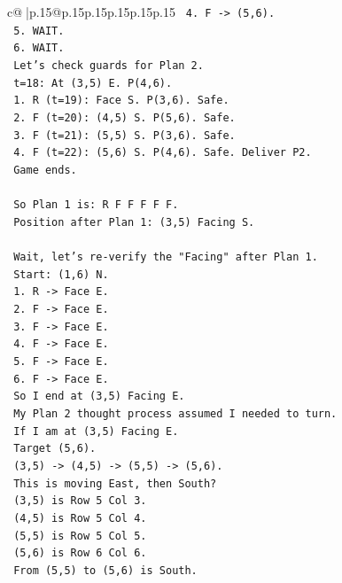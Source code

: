 \documentclass{article}
\begin{document}
{\begin{supertabular}{c@{$\;$}|p{.15\linewidth}@{}p{.15\linewidth}p{.15\linewidth}p{.15\linewidth}p{.15\linewidth}p{.15\linewidth}}
{{{\texttt{      4. F {-}> (5,6).} \\
\texttt{      5. WAIT.} \\
\texttt{      6. WAIT.} \\
\texttt{   Let's check guards for Plan 2.} \\
\texttt{   t=18: At (3,5) E. P(4,6).} \\
\texttt{   1. R (t=19): Face S. P(3,6). Safe.} \\
\texttt{   2. F (t=20): (4,5) S. P(5,6). Safe.} \\
\texttt{   3. F (t=21): (5,5) S. P(3,6). Safe.} \\
\texttt{   4. F (t=22): (5,6) S. P(4,6). Safe. Deliver P2.} \\
\texttt{   Game ends.} \\
\\ 
\texttt{   So Plan 1 is: R F F F F F.} \\
\texttt{   Position after Plan 1: (3,5) Facing S.} \\
\\ 
\texttt{   Wait, let's re{-}verify the "Facing" after Plan 1.} \\
\texttt{   Start: (1,6) N.} \\
\texttt{   1. R {-}> Face E.} \\
\texttt{   2. F {-}> Face E.} \\
\texttt{   3. F {-}> Face E.} \\
\texttt{   4. F {-}> Face E.} \\
\texttt{   5. F {-}> Face E.} \\
\texttt{   6. F {-}> Face E.} \\
\texttt{   So I end at (3,5) Facing E.} \\
\texttt{   My Plan 2 thought process assumed I needed to turn.} \\
\texttt{   If I am at (3,5) Facing E.} \\
\texttt{   Target (5,6).} \\
\texttt{   (3,5) {-}> (4,5) {-}> (5,5) {-}> (5,6).} \\
\texttt{   This is moving East, then South?} \\
\texttt{   (3,5) is Row 5 Col 3.} \\
\texttt{   (4,5) is Row 5 Col 4.} \\
\texttt{   (5,5) is Row 5 Col 5.} \\
\texttt{   (5,6) is Row 6 Col 6.} \\
\texttt{   From (5,5) to (5,6) is South.} \\
}}}
\end{supertabular}}
\end{document}
